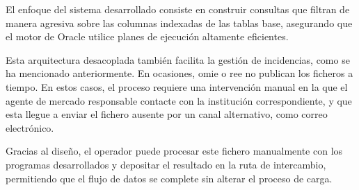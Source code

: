 El enfoque del sistema desarrollado consiste en construir consultas que filtran de manera agresiva sobre las columnas indexadas de las tablas base, asegurando que el motor de Oracle utilice planes de ejecución altamente eficientes.

Esta arquitectura desacoplada también facilita la gestión de incidencias, como se ha mencionado anteriormente. En ocasiones, \gls{omie} o \gls{ree} no publican los ficheros a tiempo. En estos casos, el proceso requiere una intervención manual en la que el agente de mercado responsable contacte con la institución correspondiente, y que esta llegue a enviar el fichero ausente por un canal alternativo, como correo electrónico.

Gracias al diseño, el operador puede procesar este fichero manualmente con los programas desarrollados y depositar el resultado en la ruta de intercambio, permitiendo que el flujo de datos se complete sin alterar el proceso de carga.
